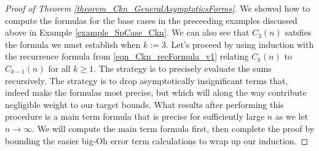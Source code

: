 \documentclass[11pt,reqno,a4letter]{article}
\numberwithin{figure}{section}
\numberwithin{table}{section}
\theoremstyle{plain}
\numberwithin{theorem}{section}
\theoremstyle{definition}
\begin{document}
\begin{proof}[Proof of Theorem \ref{theorem_Ckn_GeneralAsymptoticsForms}] 
We showed how to compute the formulas for the base cases in the preceeding examples 
discussed above in Example \ref{example_SpCase_Ckn}. 
We can also see that $C_3(n)$ satsfies the formula we must establish when $k := 3$. 
Let's proceed by using induction with the recurrence formula from 
\eqref{eqn_Ckn_recFormula_v1} 
relating $C_k(n)$ to $C_{k-1}(n)$ for all $k \geq 1$. The strategy is to 
precisely evaluate the sums recursively. 
The strategy is to drop asymptotically insignificant terms that, indeed make the formulas 
most precise, but which will along the way contribute negligible weight to our target bounds. 
What results after performing this procedure is a main term formula that is 
precise for sufficiently large $n$ as we let $n \rightarrow \infty$. 
We will compute the main term formula first, then complete the proof 
by bounding the easier big-Oh error term calculations to wrap up our induction. 


\end{proof}
\end{document}
